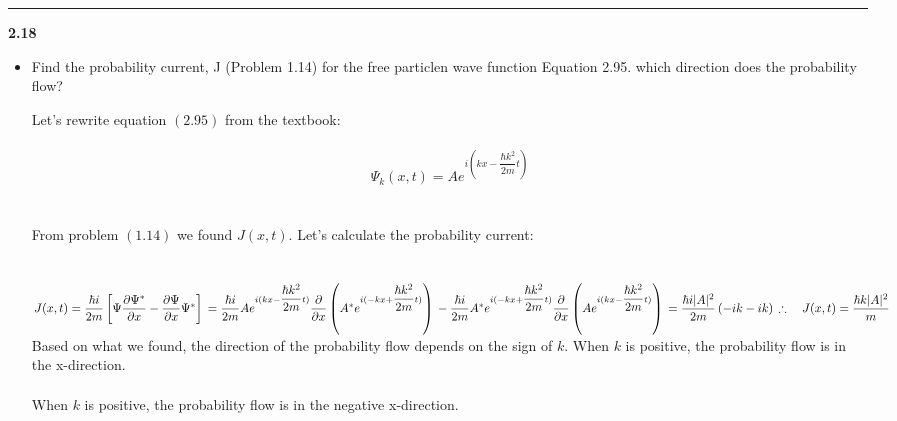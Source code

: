 \documentclass[fleqn]{article}
\begin{document}
  \rule{15cm}{1pt}

  \textbf{2.18}
  \begin{itemize}
    \item Find the probability current, J (Problem 1.14) for the free particlen wave function Equation 2.95. which
    direction does the probability flow?

      \textcolor{hwColor}{
        Let's rewrite equation $(2.95)$ from the textbook: \\
        \\
        $$\Psi_k(x,t)=A e^{i(kx-\dfrac{\hbar k^2}{2m}t)}$$ \\
        \\
        From problem $(1.14)$ we found $J(x,t)$. Let's calculate the probability current: \\
        \\
        \\
        $
          J(x,t)=\dfrac{\hbar i}{2m} \left[\Psi \dfrac{\partial \Psi^*}{\partial x}-\dfrac{\partial \Psi}{\partial x}\Psi^*\right] \\
          \\
          \\
          =\dfrac{\hbar i}{2m} A e^{i(kx-\dfrac{\hbar k^2}{2m}t)} \dfrac{\partial }{\partial x} \left(A^* e^{i(-kx+\dfrac{\hbar k^2}{2m}t)}\right) \\
          -\dfrac{\hbar i}{2m} A^* e^{i(-kx+\dfrac{\hbar k^2}{2m}t)} \dfrac{\partial }{\partial x} \left(A e^{i(kx-\dfrac{\hbar k^2}{2m}t)}\right) \\
          \\
          \\
          =\dfrac{\hbar i |A|^2}{2m} \left(-ik-ik\right) \\
          \\
          \\
          \\
          \therefore ~~~  J(x,t)=\dfrac{\hbar k |A|^2}{m} \\ \\
        $
        Based on what we found, the direction of the probability flow depends on the sign of $k$. When $k$ is positive, 
        the probability flow is in the x-direction. \\
        \\
        When $k$ is positive, the probability flow is in the negative x-direction. 
      }

  \end{itemize}
\end{document}
